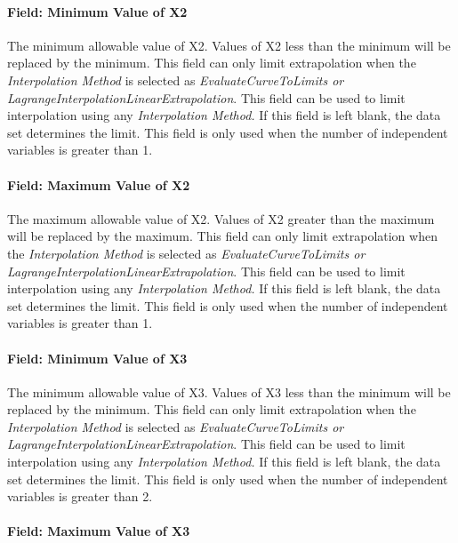 \paragraph{Field: Minimum Value of X2}\label{field-minimum-value-of-x2}

The minimum allowable value of X2. Values of X2 less than the minimum will be replaced by the minimum. This field can only limit extrapolation when the \emph{Interpolation Method} is selected as \emph{EvaluateCurveToLimits or LagrangeInterpolationLinearExtrapolation}. This field can be used to limit interpolation using any \emph{Interpolation Method.} If this field is left blank, the data set determines the limit. This field is only used when the number of independent variables is greater than 1.

\paragraph{Field: Maximum Value of X2}\label{field-maximum-value-of-x2}

The maximum allowable value of X2. Values of X2 greater than the maximum will be replaced by the maximum. This field can only limit extrapolation when the \emph{Interpolation Method} is selected as \emph{EvaluateCurveToLimits or LagrangeInterpolationLinearExtrapolation}. This field can be used to limit interpolation using any \emph{Interpolation Method.} If this field is left blank, the data set determines the limit. This field is only used when the number of independent variables is greater than 1.

\paragraph{Field: Minimum Value of X3}\label{field-minimum-value-of-x3}

The minimum allowable value of X3. Values of X3 less than the minimum will be replaced by the minimum. This field can only limit extrapolation when the \emph{Interpolation Method} is selected as \emph{EvaluateCurveToLimits or LagrangeInterpolationLinearExtrapolation}. This field can be used to limit interpolation using any \emph{Interpolation Method.} If this field is left blank, the data set determines the limit. This field is only used when the number of independent variables is greater than 2.

\paragraph{Field: Maximum Value of X3}\label{field-maximum-value-of-x3}

